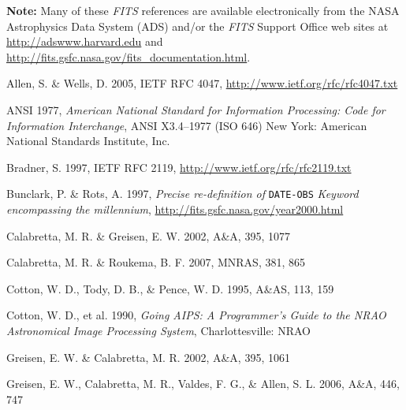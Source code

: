 \documentclass[onecolumn]{aa}
\begin{document}
\begin{thebibliography}{9999}


 {\bf Note:} Many of these {\em FITS\/} references are available electronically 
from the NASA Astrophysics Data System (ADS)  and/or the 
{\em FITS\/} Support Office web sites at
\newline
 \url{http://adswww.harvard.edu} and
\newline
\url{http://fits.gsfc.nasa.gov/fits\_documentation.html}. 
\ \newline
\ \newline

 Allen, S. \& Wells, D. 2005,
IETF RFC 4047,
\newline
\url{http://www.ietf.org/rfc/rfc4047.txt}

 ANSI 1977, {\it American National Standard for Information Processing:
      Code for Information Interchange},
      ANSI X3.4--1977 (ISO 646) New York: American National 
      Standards
      Institute, Inc.

 Bradner, S. 1997,  IETF RFC 2119, \url{http://www.ietf.org/rfc/rfc2119.txt} 

 Bunclark, P. \& Rots, A. 1997, {\it Precise re-definition of}
   {\tt DATE-OBS} {\it Keyword encompassing the millennium},
\newline
\url{http://fits.gsfc.nasa.gov/year2000.html}

  Calabretta, M. R. \& Greisen, E. W. 2002,
 A\&A, 395, 1077

 Calabretta, M. R. \& Roukema, B. F. 2007,
 MNRAS, 381, 865

 Cotton, W. D., Tody, D. B., \& Pence, W. D. 1995, 
    A\&AS, 113, 159 

 Cotton, W. D., et al. 1990, {\it Going AIPS: A Programmer's Guide
to the NRAO Astronomical Image Processing System},  Charlottesville: NRAO

  Greisen, E. W. \& Calabretta, M. R. 2002,
 A\&A, 395, 1061 

  Greisen, E. W., Calabretta, M. R., Valdes, F. G., \& Allen, S. L. 2006,
 A\&A, 446, 747


\end{thebibliography}
\end{document}

